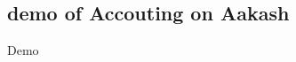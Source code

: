 \documentclass{beamer}
\begin{document}
  \subsection{demo of Accouting on Aakash}
  \begin{frame}{Demo}
    \begin{block}{}
    \end{block}
  \end{frame}

  









\end{document}

